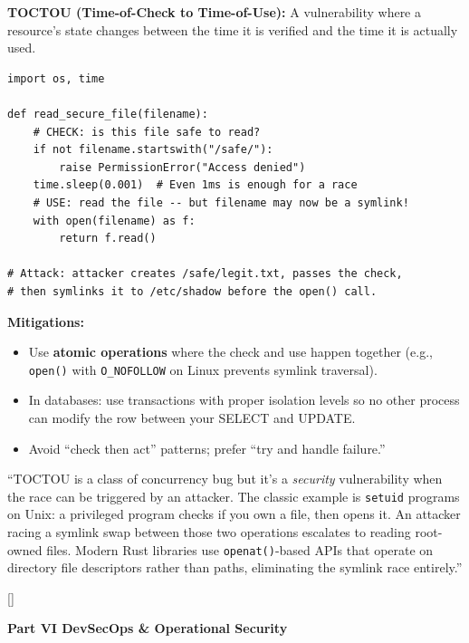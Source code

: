 \documentclass[11pt, letterpaper]{article}
\newcommand{\greensections}{%
  \titleformat{\section}{\large\bfseries\color{sectiongreen}}{}{0em}{}[\color{sectiongreen}\titlerule]%
  \titleformat{\subsection}{\normalsize\bfseries\color{sectiongreen!80!black}}{}{0em}{}%
}
\newcommand{\partbanner}[3]{%
  \begin{tcolorbox}[colback=#1, colframe=#2, boxrule=1.2pt, arc=4pt,
    left=8pt, right=8pt, top=6pt, bottom=6pt]
    \begin{center}{\LARGE\bfseries #3}\end{center}
  \end{tcolorbox}%
}
\newcommand{\talkingpoint}[1]{%
  \begin{tcolorbox}[colback=talkbg, colframe=talkborder,
    title={\bfseries Interview Talking Point}, arc=3pt, boxrule=1pt]
  #1
  \end{tcolorbox}%
}
\begin{document}
\textbf{TOCTOU (Time-of-Check to Time-of-Use):} A vulnerability where a resource's state changes between the time it is verified and the time it is actually used.

\begin{lstlisting}[style=vuln, caption={Classic TOCTOU with a file}]
import os, time

def read_secure_file(filename):
    # CHECK: is this file safe to read?
    if not filename.startswith("/safe/"):
        raise PermissionError("Access denied")
    time.sleep(0.001)  # Even 1ms is enough for a race
    # USE: read the file -- but filename may now be a symlink!
    with open(filename) as f:
        return f.read()

# Attack: attacker creates /safe/legit.txt, passes the check,
# then symlinks it to /etc/shadow before the open() call.
\end{lstlisting}

\textbf{Mitigations:}
\begin{itemize}[noitemsep]
  \item Use \textbf{atomic operations} where the check and use happen together (e.g., \texttt{open()} with \texttt{O\_NOFOLLOW} on Linux prevents symlink traversal).
  \item In databases: use transactions with proper isolation levels so no other process can modify the row between your SELECT and UPDATE.
  \item Avoid ``check then act'' patterns; prefer ``try and handle failure.''
\end{itemize}

\talkingpoint{``TOCTOU is a class of concurrency bug but it's a \emph{security} vulnerability when the race can be triggered by an attacker. The classic example is \texttt{setuid} programs on Unix: a privileged program checks if you own a file, then opens it. An attacker racing a symlink swap between those two operations escalates to reading root-owned files. Modern Rust libraries use \texttt{openat()}-based APIs that operate on directory file descriptors rather than paths, eliminating the symlink race entirely.''}

\newpage

\greensections
{}
\partbanner{part2bg}{sectiongreen}{Part VI \quad DevSecOps \& Operational Security}
\end{document}
